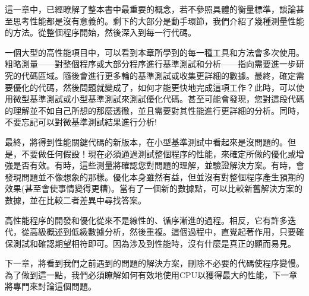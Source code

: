 這一章中，已經瞭解了整本書中最重要的概念，若不參照具體的衡量標準，談論甚至思考性能都是沒有意義的。剩下的大部分是動手環節，我們介紹了幾種測量性能的方法。從整個程序開始，然後深入到每一行代碼。

一個大型的高性能項目中，可以看到本章所學到的每一種工具和方法會多次使用。粗略測量——對整個程序或大部分程序進行基準測試和分析——指向需要進一步研究的代碼區域。隨後會進行更多輪的基準測試或收集更詳細的數據。最終，確定需要優化的代碼，然後問題就變成了，如何才能更快地完成這項工作？此時，可以使用微型基準測試或小型基準測試來測試優化代碼。甚至可能會發現，您對這段代碼的理解並不如自己所想的那麼透徹，並且需要對其性能進行更詳細的分析。同時，不要忘記可以對微基準測試結果進行分析!

最終，將得到性能關鍵代碼的新版本，在小型基準測試中看起來是沒問題的。但是，不要做任何假設！現在必須通過測試整個程序的性能，來確定所做的優化或增強是否有效。有時，這些測量將確認您對問題的理解，並驗證解決方案。有時，會發現問題並不像想象的那樣。優化本身雖然有益，但並沒有對整個程序產生預期的效果(甚至會使事情變得更糟)。當有了一個新的數據點，可以比較新舊解決方案的數據，並在比較二者差異中尋找答案。

高性能程序的開發和優化從來不是線性的、循序漸進的過程。相反，它有許多迭代，從高級概述到低級數據分析，然後重複。這個過程中，直覺起著作用，只要確保測試和確認期望相符即可。因為涉及到性能時，沒有什麼是真正的顯而易見。

下一章，將看到我們之前遇到的問題的解決方案，刪除不必要的代碼使程序變慢。為了做到這一點，我們必須瞭解如何有效地使用CPU以獲得最大的性能，下一章將專門來討論這個問題。